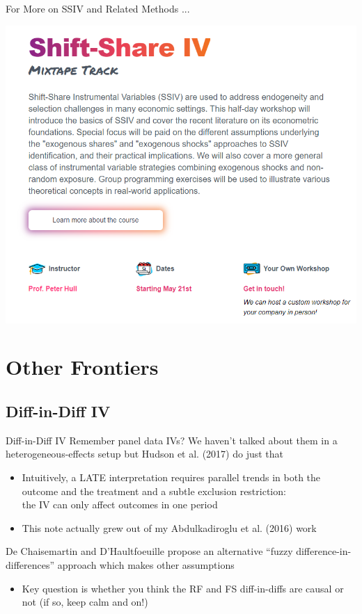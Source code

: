 \documentclass{beamer}
\begin{document}
\begin{frame}{For More on SSIV and Related Methods ... }
\begin{center}
\includegraphics[scale=0.4]{./lecture_includes/ssiv_plug.png}
\end{center}
\end{frame}

\section{Other Frontiers}

\subsection{Diff-in-Diff IV}
\begin{frame}{Diff-in-Diff IV}
Remember panel data IVs? We haven't talked about them in a heterogeneous-effects setup but Hudson et al. (2017) do just that\smallskip
\begin{itemize}
\item Intuitively, a LATE interpretation requires parallel trends in both the outcome and the treatment and a subtle exclusion restriction: \\ the IV can only affect outcomes in one period \smallskip
\item This note actually grew out of my Abdulkadiroglu et al. (2016) work
\end{itemize}\bigskip\pause{}

De Chaisemartin and D'Haultfoeuille propose an alternative ``fuzzy difference-in-differences'' approach which makes other assumptions\smallskip
\begin{itemize}
\item Key question is whether you think the RF and FS diff-in-diffs are causal or not (if so, keep calm and  on!)
\end{itemize}

\end{frame}
\end{document}
